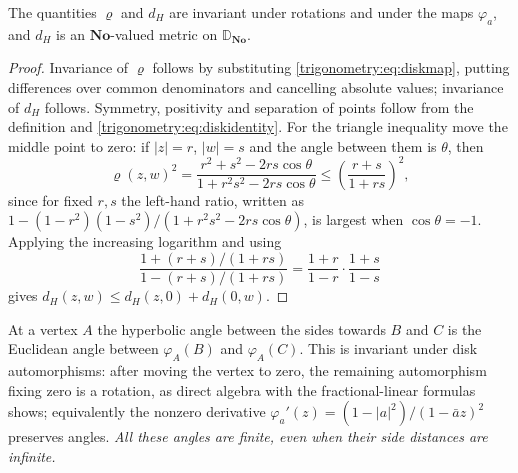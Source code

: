 \documentclass[11pt,letterpaper]{article}
\numberwithin{equation}{section}
\theoremstyle{definition}
\theoremstyle{remark}
\newcommand{\No}{\mathbf{No}}
\newcommand{\Dd}{\mathbb D}
\begin{document}
\begin{proposition}\label{trigonometry:prop:diskmetric}
The quantities $\varrho$ and $d_H$ are invariant under rotations and under the maps $\varphi_a$,
and $d_H$ is an $\No$-valued metric on $\Dd_{\No}$.
\end{proposition}
\begin{proof}
Invariance of $\varrho$ follows by substituting \cref{trigonometry:eq:diskmap}, putting differences
over common denominators and cancelling absolute values; invariance of $d_H$ follows. Symmetry,
positivity and separation of points follow from the definition and
\cref{trigonometry:eq:diskidentity}. For the triangle inequality move the middle point to zero: if
$|z|=r$, $|w|=s$ and the angle between them is $\theta$, then
\[
 \varrho(z,w)^2=\frac{r^2+s^2-2rs\cos\theta}{1+r^2s^2-2rs\cos\theta}
 \le\left(\frac{r+s}{1+rs}\right)^2,
\]
since for fixed $r,s$ the left-hand ratio, written as
$1-(1-r^2)(1-s^2)/(1+r^2s^2-2rs\cos\theta)$, is largest when $\cos\theta=-1$. Applying the
increasing logarithm and using
\[
 \frac{1+(r+s)/(1+rs)}{1-(r+s)/(1+rs)}=\frac{1+r}{1-r}\cdot\frac{1+s}{1-s}
\]
gives $d_H(z,w)\le d_H(z,0)+d_H(0,w)$.
\end{proof}
At a vertex $A$ the hyperbolic angle between the sides towards $B$ and $C$ is the Euclidean angle
between $\varphi_A(B)$ and $\varphi_A(C)$. This is invariant under disk automorphisms: after moving
the vertex to zero, the remaining automorphism fixing zero is a rotation, as direct algebra with
the fractional-linear formulas shows; equivalently the nonzero derivative
$\varphi_a'(z)=(1-|a|^2)/(1-\bar az)^2$ preserves angles. \emph{All these angles are finite, even
when their side distances are infinite.}
\end{document}
